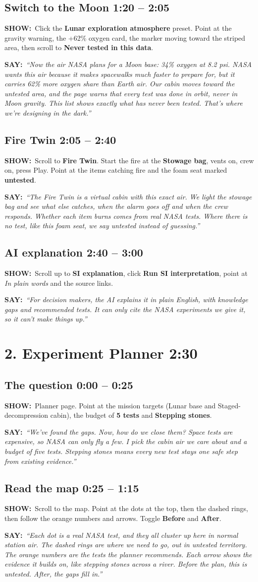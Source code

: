 \documentclass[11pt,a4paper]{article}
\newcommand{\showit}[1]{\par\textbf{\color{showc}SHOW:}\ #1\par}
\newcommand{\sayit}[1]{\par\textbf{\color{sayc}SAY:}\ \textit{``#1''}\par\medskip}
\newcommand{\step}[2]{\subsection{#1 \hfill\normalsize\color{muted}#2}}
\begin{document}
\step{Switch to the Moon}{1:20 -- 2:05}
\showit{Click the \textbf{Lunar exploration atmosphere} preset. Point at the gravity warning, the +62\% oxygen card, the marker moving toward the striped area, then scroll to \textbf{Never tested in this data}.}
\sayit{Now the air NASA plans for a Moon base: 34\% oxygen at 8.2 psi. NASA wants this air because it makes spacewalks much faster to prepare for, but it carries 62\% more oxygen share than Earth air. Our cabin moves toward the untested area, and the page warns that every test was done in orbit, never in Moon gravity. This list shows exactly what has never been tested. That's where we're designing in the dark.}

\step{Fire Twin}{2:05 -- 2:40}
\showit{Scroll to \textbf{Fire Twin}. Start the fire at the \textbf{Stowage bag}, vents on, crew on, press Play. Point at the items catching fire and the foam seat marked \textbf{untested}.}
\sayit{The Fire Twin is a virtual cabin with this exact air. We light the stowage bag and see what else catches, when the alarm goes off and when the crew responds. Whether each item burns comes from real NASA tests. Where there is no test, like this foam seat, we say untested instead of guessing.}

\step{AI explanation}{2:40 -- 3:00}
\showit{Scroll up to \textbf{SI explanation}, click \textbf{Run SI interpretation}, point at \textit{In plain words} and the source links.}
\sayit{For decision makers, the AI explains it in plain English, with knowledge gaps and recommended tests. It can only cite the NASA experiments we give it, so it can't make things up.}

\section{2. Experiment Planner \hfill \normalsize 2:30}

\step{The question}{0:00 -- 0:25}
\showit{Planner page. Point at the mission targets (Lunar base and Staged-decompression cabin), the budget of \textbf{5 tests} and \textbf{Stepping stones}.}
\sayit{We've found the gaps. Now, how do we close them? Space tests are expensive, so NASA can only fly a few. I pick the cabin air we care about and a budget of five tests. Stepping stones means every new test stays one safe step from existing evidence.}

\step{Read the map}{0:25 -- 1:15}
\showit{Scroll to the map. Point at the dots at the top, then the dashed rings, then follow the orange numbers and arrows. Toggle \textbf{Before} and \textbf{After}.}
\sayit{Each dot is a real NASA test, and they all cluster up here in normal station air. The dashed rings are where we need to go, out in untested territory. The orange numbers are the tests the planner recommends. Each arrow shows the evidence it builds on, like stepping stones across a river. Before the plan, this is untested. After, the gaps fill in.}
\end{document}
